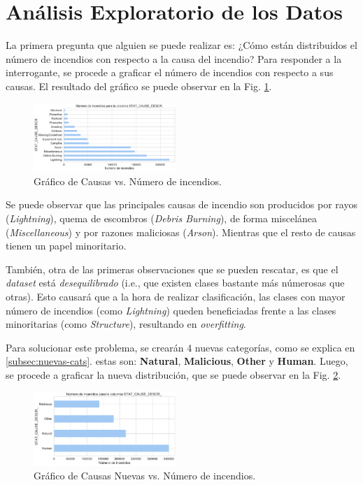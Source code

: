\section{Análisis Exploratorio de los Datos}
La primera pregunta que alguien se puede realizar es: ¿Cómo están distribuidos el número de incendios con respecto a la causa del incendio? Para responder a la interrogante, se procede a graficar el número de incendios con respecto a sus causas. El resultado del gráfico se puede observar en la Fig. \ref{fig:SCD}. 

\begin{figure}
    \centering
    \includegraphics[width=0.48\textwidth]{imagenes/barh_STAT_CAUSE_DESCR.pdf}
    \caption{Gráfico de Causas vs. Número de incendios.}
    \label{fig:SCD}
\end{figure}

Se puede observar que las principales causas de incendio son producidos por rayos (\textit{Lightning}), quema de escombros (\textit{Debris Burning}), de forma miscelánea (\textit{Miscellaneous}) y por razones maliciosas (\textit{Arson}). Mientras que el resto de causas tienen un papel minoritario. 

También, otra de las primeras observaciones que se pueden rescatar, es que el \textit{dataset} está \textit{desequilibrado} (i.e., que existen clases bastante más númerosas que otras). Esto causará que a la hora de realizar clasificación, las clases con mayor número de incendios (como \textit{Lightning}) queden beneficiadas frente a las clases minoritarias (como \textit{Structure}), resultando en \textit{overfitting}.

Para solucionar este problema, se crearán 4 nuevas categorías, como se explica en \ref{subsec:nuevas-cats}. estas son: \textbf{Natural}, \textbf{Malicious}, \textbf{Other} y \textbf{Human}. Luego, se procede a graficar la nueva distribución, que se puede observar en la Fig. \ref{fig:SCDN}.

\begin{figure}
    \centering
    \includegraphics[width=0.48\textwidth]{imagenes/barh_STAT_CAUSE_DESCR_.pdf}
    \caption{Gráfico de Causas Nuevas vs. Número de incendios.}
    \label{fig:SCDN}
\end{figure}

